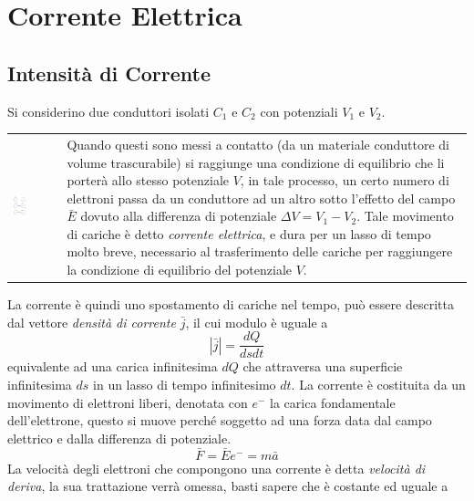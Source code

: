 \documentclass[10pt, letterpaper]{report}
\begin{document}
\chapter{Corrente Elettrica}
\section{Intensità di Corrente}
Si considerino due conduttori isolati $C_1$ e $C_2$ con potenziali $V_1$ e $V_2$. 
\begin{center}
	\begin{tabular}{>{\centering\arraybackslash}m{3in}>{\centering\arraybackslash}m{3in}}
		\includegraphics[width=0.3\textwidth]{images/corrente.eps} &   
		Quando questi sono messi a contatto (da un materiale conduttore di volume trascurabile) si raggiunge una condizione di equilibrio che li porterà allo stesso potenziale $V$, in tale processo, un certo numero di elettroni passa da un conduttore ad un altro sotto l'effetto del campo $\bar E$ dovuto alla differenza di potenziale $\Delta V=V_1-V_2$. 
Tale movimento di cariche è detto \textit{corrente elettrica}, e dura per un lasso di tempo molto breve, necessario al trasferimento delle cariche per raggiungere la condizione di equilibrio del potenziale $V$.
		\\
	\end{tabular}
\end{center}
La corrente è quindi uno spostamento di cariche nel tempo, può essere descritta dal vettore \textit{densità di corrente} $\bar j$, il cui modulo è uguale a 
$$ |\bar j|=\frac{dQ}{dsdt}$$
equivalente ad una carica infinitesima $dQ$ che attraversa una superficie infinitesima $ds$ in un lasso di tempo infinitesimo $dt$. La corrente è costituita da un movimento di elettroni liberi, denotata con $e^-$ la carica fondamentale dell'elettrone, questo si muove perché soggetto ad una forza data dal campo elettrico e dalla differenza di potenziale. 
$$ \bar F = \bar Ee^-=m\bar a$$
La velocità degli elettroni che compongono una corrente è detta \textit{velocità di deriva}, la sua trattazione verrà omessa, basti sapere che è costante ed uguale a 
\end{document}
